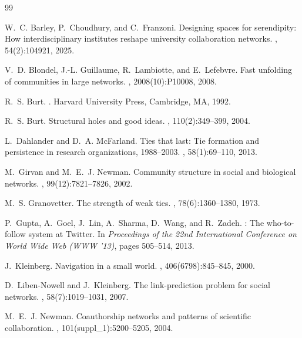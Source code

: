 \begin{thebibliography}{99}
\setlength{\itemsep}{1.5pt}\setlength{\parskip}{0pt}

W.~C. Barley, P.~Choudhury, and C.~Franzoni.
\newblock Designing spaces for serendipity: How interdisciplinary institutes reshape university collaboration networks.
, 54(2):104921, 2025.

V.~D. Blondel, J.-L. Guillaume, R.~Lambiotte, and E.~Lefebvre.
\newblock Fast unfolding of communities in large networks.
, 2008(10):P10008, 2008.

R.~S. Burt.
.
\newblock Harvard University Press, Cambridge, MA, 1992.

R.~S. Burt.
\newblock Structural holes and good ideas.
, 110(2):349--399, 2004.

L.~Dahlander and D.~A. McFarland.
\newblock Ties that last: Tie formation and persistence in research organizations, 1988--2003.
, 58(1):69--110, 2013.

M.~Girvan and M.~E.~J. Newman.
\newblock Community structure in social and biological networks.
, 99(12):7821--7826, 2002.

M.~S. Granovetter.
\newblock The strength of weak ties.
, 78(6):1360--1380, 1973.

P.~Gupta, A.~Goel, J.~Lin, A.~Sharma, D.~Wang, and R.~Zadeh.
: The who-to-follow system at {Twitter}.
\newblock In {\em Proceedings of the 22nd International Conference on World Wide Web (WWW '13)}, pages 505--514, 2013.

J.~Kleinberg.
\newblock Navigation in a small world.
, 406(6798):845--845, 2000.

D.~Liben-Nowell and J.~Kleinberg.
\newblock The link-prediction problem for social networks.
, 58(7):1019--1031, 2007.

M.~E.~J. Newman.
\newblock Coauthorship networks and patterns of scientific collaboration.
, 101(suppl\_1):5200--5205, 2004.


\end{thebibliography}
